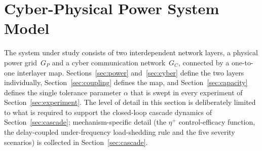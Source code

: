 
\section{Cyber-Physical Power System Model}\label{sec:model}

The system under study consists of two interdependent network layers,
a physical power grid~$G_P$ and a cyber communication network~$G_C$,
connected by a one-to-one interlayer map.  Sections~\ref{sec:power}
and~\ref{sec:cyber} define the two layers individually,
Section~\ref{sec:coupling} defines the map, and
Section~\ref{sec:capacity} defines the single tolerance parameter
$\alpha$ that is swept in every experiment of
Section~\ref{sec:experiment}.  The level of detail in this section is
deliberately limited to what is required to support the closed-loop
cascade dynamics of Section~\ref{sec:cascade}; mechanism-specific
detail (the $\eta^{+}$ control-efficacy function, the delay-coupled
under-frequency load-shedding rule and the five severity scenarios)
is collected in Section~\ref{sec:cascade}.

